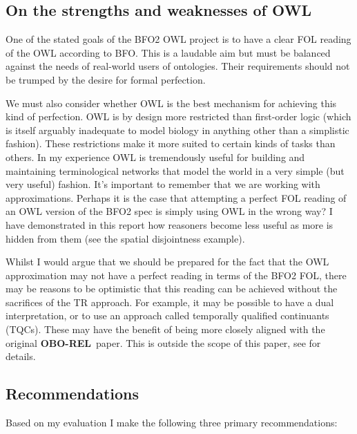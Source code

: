 \documentclass{bioinfo}
\def\OBOREL{\textbf{OBO-REL}}
\begin{document}
\subsection{On the strengths and weaknesses of OWL}

One of the stated goals of the BFO2 OWL project is to have a clear FOL
reading of the OWL according to BFO. This is a laudable aim but must
be balanced against the needs of real-world users of ontologies. Their
requirements should not be trumped by the desire for formal perfection.

We must also consider whether OWL is the best mechanism for achieving
this kind of perfection. OWL is by design more restricted than
first-order logic (which is itself arguably inadequate to model
biology in anything other than a simplistic fashion). These
restrictions make it more suited to certain kinds of tasks than
others. In my experience OWL is tremendously useful for building and
maintaining terminological networks that model the world in a very
simple (but very useful) fashion. It's important to remember that we
are working with approximations. Perhaps it is the case that
attempting a perfect FOL reading of an OWL version of the BFO2 spec is
simply using OWL in the wrong way? I have demonstrated in this report
how reasoners become less useful as more is hidden from them (see the
spatial disjointness example).

Whilst I would argue that we should be prepared for the fact that the
OWL approximation may not have a perfect reading in terms of the BFO2
FOL, there may be reasons to be optimistic that this reading can be
achieved without the sacrifices of the TR approach. For example, it
may be possible to have a dual interpretation, or to use an approach
called temporally qualified continuants (TQCs). These may have the
benefit of being more closely aligned with the original \OBOREL\
paper. This is outside the scope of this paper, see \cite{Grewe} for
details.

\subsection{Recommendations}

Based on my evaluation I make the following three primary
recommendations:
\end{document}

